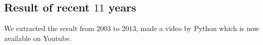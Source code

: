  
\subsection{Result of recent $11$ years}
We extracted the result from $2003$ to $2013$, made a video by Python which is now available on Youtube.
